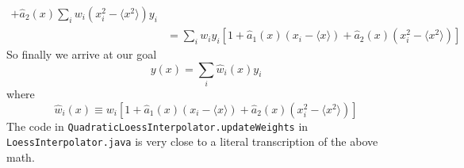 \documentclass[oneside]{tufte-handout}
\newcommand\code[1]{\texttt{#1}}
\begin{document}
\begin{fullwidth}
\begin{align}
         + \hat{a}_2(x) \sum_i w_i (x_i^2 - \langle x^2 \rangle) y_i \\
     &= \sum_i w_i y_i \left[1 + \hat{a}_1(x) (x_i - \langle x \rangle) 
         + \hat{a}_2(x) (x_i^2 - \langle x^2 \rangle)\right]
\end{align}
So finally we arrive at our goal
\begin{equation}
y(x)     = \sum_i \hat{w}_i(x) y_i
\end{equation}
where
\begin{equation}
    \hat{w}_i(x) \equiv w_i \left[1 + \hat{a}_1(x) (x_i - \langle x \rangle) 
         + \hat{a}_2(x) (x_i^2 - \langle x^2 \rangle)\right]
\end{equation}
The code in \code{QuadraticLoessInterpolator.updateWeights} in \code{LoessInterpolator.java} is very close to a literal transcription of the above math.

\end{fullwidth}
\end{document}
